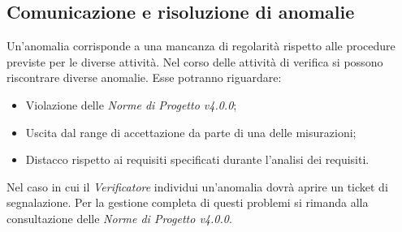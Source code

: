 \subsection{Comunicazione e risoluzione di anomalie}
Un'anomalia corrisponde a una mancanza di regolarità rispetto alle procedure previste per le diverse attività. Nel corso delle attività di verifica si possono riscontrare diverse anomalie. Esse potranno riguardare:
\begin{itemize}
	\item Violazione delle \textit{Norme di Progetto v4.0.0};
	\item Uscita dal range di accettazione da parte di una delle misurazioni;
	\item Distacco rispetto ai requisiti specificati durante l'analisi dei requisiti.
\end{itemize}
Nel caso in cui il \textit{Verificatore} individui un'anomalia dovrà aprire un ticket di segnalazione. Per la gestione completa di questi problemi si rimanda alla consultazione delle \textit{Norme di Progetto v4.0.0}.
